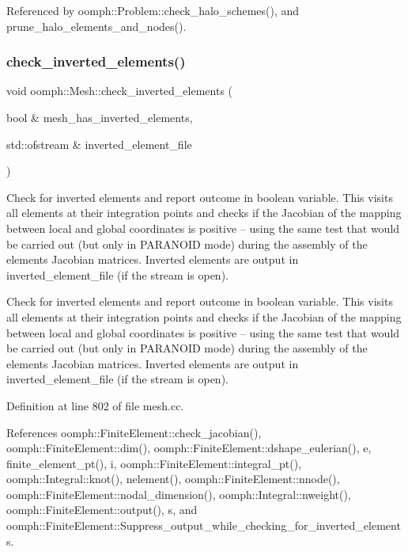 Referenced by oomph\+::\+Problem\+::check\+\_\+halo\+\_\+schemes(), and prune\+\_\+halo\+\_\+elements\+\_\+and\+\_\+nodes().

\mbox{\label{classoomph_1_1Mesh_a76adc3fcd3e49d3bd2e3b9d92c854430}} 
\subsubsection{\texorpdfstring{check\+\_\+inverted\+\_\+elements()}{check\_inverted\_elements()}\hspace{0.1cm}{\footnotesize\ttfamily [1/2]}}
{\footnotesize\ttfamily void oomph\+::\+Mesh\+::check\+\_\+inverted\+\_\+elements (\begin{DoxyParamCaption}\item[{bool \&}]{mesh\+\_\+has\+\_\+inverted\+\_\+elements,  }\item[{std\+::ofstream \&}]{inverted\+\_\+element\+\_\+file }\end{DoxyParamCaption})}



Check for inverted elements and report outcome in boolean variable. This visits all elements at their integration points and checks if the Jacobian of the mapping between local and global coordinates is positive -- using the same test that would be carried out (but only in P\+A\+R\+A\+N\+O\+ID mode) during the assembly of the elements\textquotesingle{} Jacobian matrices. Inverted elements are output in inverted\+\_\+element\+\_\+file (if the stream is open). 

Check for inverted elements and report outcome in boolean variable. This visits all elements at their integration points and checks if the Jacobian of the mapping between local and global coordinates is positive -- using the same test that would be carried out (but only in P\+A\+R\+A\+N\+O\+ID mode) during the assembly of the elements\textquotesingle{} Jacobian matrices. Inverted elements are output in inverted\+\_\+element\+\_\+file (if the stream is open). 

Definition at line 802 of file mesh.\+cc.



References oomph\+::\+Finite\+Element\+::check\+\_\+jacobian(), oomph\+::\+Finite\+Element\+::dim(), oomph\+::\+Finite\+Element\+::dshape\+\_\+eulerian(), e, finite\+\_\+element\+\_\+pt(), i, oomph\+::\+Finite\+Element\+::integral\+\_\+pt(), oomph\+::\+Integral\+::knot(), nelement(), oomph\+::\+Finite\+Element\+::nnode(), oomph\+::\+Finite\+Element\+::nodal\+\_\+dimension(), oomph\+::\+Integral\+::nweight(), oomph\+::\+Finite\+Element\+::output(), s, and oomph\+::\+Finite\+Element\+::\+Suppress\+\_\+output\+\_\+while\+\_\+checking\+\_\+for\+\_\+inverted\+\_\+elements.



